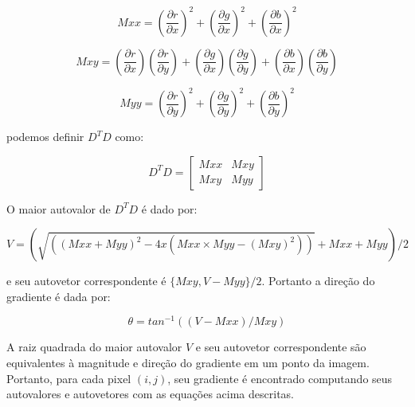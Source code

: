 





$$ Mxx = (\frac{\partial r}{\partial x})^2+(\frac{\partial g}{\partial x})^2+(\frac{\partial b}{\partial x})^2 $$

$$ Mxy =(\frac{\partial r}{\partial x})(\frac{\partial r}{\partial y})+(\frac{\partial g}{\partial x})(\frac{\partial g}{\partial y})+(\frac{\partial b}{\partial x})(\frac{\partial b}{\partial y}) $$

$$ Myy = (\frac{\partial r}{\partial y})^2+(\frac{\partial g}{\partial y})^2+(\frac{\partial b}{\partial y})^2 $$

podemos definir $D^TD$ como:

$$ D^T D = \begin{bmatrix} Mxx & Mxy \\ Mxy & Myy \end{bmatrix}$$


O maior autovalor de $D^TD$ é dado por:

$$ V = (\sqrt{( (Mxx+Myy)^2 - 4 x(Mxx \times Myy - (Mxy)^2 ) )}+Mxx+ Myy)/2 $$

e seu autovetor correspondente é $ \{Mxy,V-Myy\}/2 $. Portanto a direção do gradiente é dada por:

$$ \theta = tan^{-1}((V-Mxx)/Mxy) $$

A raiz quadrada do maior autovalor $V$ e seu autovetor correspondente são equivalentes à magnitude e direção do gradiente em um ponto da imagem. Portanto, para cada pixel $(i,j)$, seu gradiente é encontrado computando seus autovalores e autovetores com as equações acima descritas.



